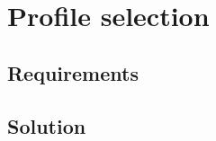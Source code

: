 \section{Profile selection}
\label{design:profile_selection}
\subsection{Requirements}


\subsection{Solution}

